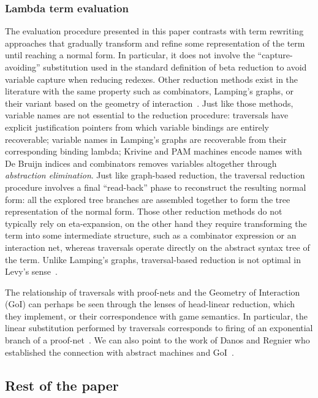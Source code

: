 \documentclass{elsarticle}
\theoremstyle{plain}
\theoremstyle{definition}
\theoremstyle{remark}
\begin{document}
\subsubsection{Lambda term evaluation}
The evaluation procedure presented in this paper contrasts with term rewriting approaches that gradually transform and refine some representation of the term until reaching a normal form. In particular, it does not involve the ``capture-avoiding'' substitution used in the standard definition of beta reduction to avoid variable capture when reducing redexes. Other reduction methods exist in the literature with the same property such as combinators, Lamping's graphs, or their variant based on the geometry of interaction~\cite{Lamping:1989:AOL:96709.96711, Gonthier:1992:GOL:143165.143172, curry_combinatorylogic, Barendregt84, the-implementation-of-functional-programming-languages}.
Just like those methods, variable names are not essential to the reduction procedure: traversals have explicit justification pointers from which variable bindings are entirely recoverable; variable names in Lamping's graphs are recoverable from their corresponding binding lambda;
Krivine and PAM machines encode names with De Bruijn indices
and combinators removes variables altogether through \emph{abstraction elimination}.
Just like graph-based reduction, the traversal reduction procedure involves a final ``read-back'' phase to reconstruct the resulting normal form: all the explored tree branches are assembled together to form the tree representation of the normal form. Those other reduction methods do not typically rely on eta-expansion, on the other hand they require transforming the term into some intermediate structure, such as a combinator expression or an interaction net, whereas traversals operate directly on the abstract syntax tree of the term. Unlike Lamping's graphs, traversal-based reduction is not optimal in Levy's sense~\cite{optimal-reduction-levy}.

The relationship of traversals with proof-nets and the Geometry of Interaction (GoI) can perhaps be seen through the lenses of head-linear reduction, which they implement, or their correspondence with game semantics. In particular, the linear substitution performed by traversals corresponds to firing of an exponential branch of a proof-net~\cite{MASCARI1994111}. We can also point to the work of Danos and Regnier who established the connection with abstract machines and GoI~\cite{danosherbelinregnier1996}.

\subsection{Rest of the paper}
\end{document}

